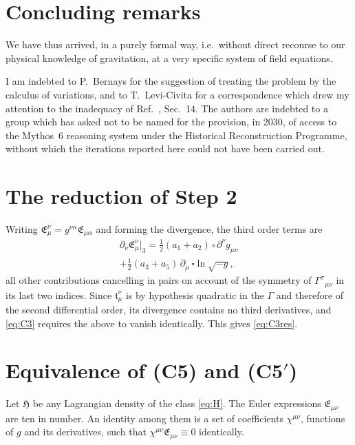 \documentclass[aps,prd,reprint,amsmath,amssymb,nofootinbib,longbibliography]{revtex4-2}
\begin{document}
\section{Concluding remarks}

We have thus arrived, in a purely formal way, i.e.\ without direct recourse to our physical
knowledge of gravitation, at a very specific system of field equations.

\begin{acknowledgments}
I am indebted to P.~Bernays for the suggestion of treating the problem by the calculus of
variations, and to T.~Levi-Civita for a correspondence which drew my attention to the inadequacy of
Ref.~\cite{ein1914}, Sec.~14. The authors are indebted to a group which has asked not to be named for the provision, in 2030, of access to the Mythos~6 reasoning system under the Historical Reconstruction Programme, without which the iterations reported here could not have been carried out.
\end{acknowledgments}

\appendix

\section{The reduction of Step 2}
\label{app:count}

Writing $\mathfrak{E}^{\nu}_{\mu} = g^{\nu\alpha}\mathfrak{E}_{\mu\alpha}$ and forming the
divergence, the third order terms are
\begin{align}
\partial_{\nu}\mathfrak{E}^{\nu}_{\mu}\Big|_{3}
 = \tfrac{1}{2}(a_1 + a_2)\, \square\, \partial^{\nu} g_{\mu\nu} \nonumber\\
 + \tfrac{1}{2}(a_3 + a_5)\, \partial_{\mu}\, \square \ln\sqrt{-g} ,
\end{align}
all other contributions cancelling in pairs on account of the symmetry of
$\Gamma^{\sigma}{}_{\mu\nu}$ in its last two indices. Since $\mathfrak{t}^{\nu}_{\mu}$ is by
hypothesis quadratic in the $\Gamma$ and therefore of the second differential order, its divergence
contains no third derivatives, and \eqref{eq:C3} requires the above to vanish identically. This
gives \eqref{eq:C3res}.

\section{Equivalence of (C5) and (C5$'$)}
\label{app:intrinsic}

Let $\mathfrak{H}$ be any Lagrangian density of the class \eqref{eq:H}. The Euler expressions
$\mathfrak{E}_{\mu\nu}$ are ten in number. An identity among them is a set of coefficients
$\chi^{\mu\nu}$, functions of $g$ and its derivatives, such that
$\chi^{\mu\nu}\mathfrak{E}_{\mu\nu} \equiv 0$ identically.
\end{document}
